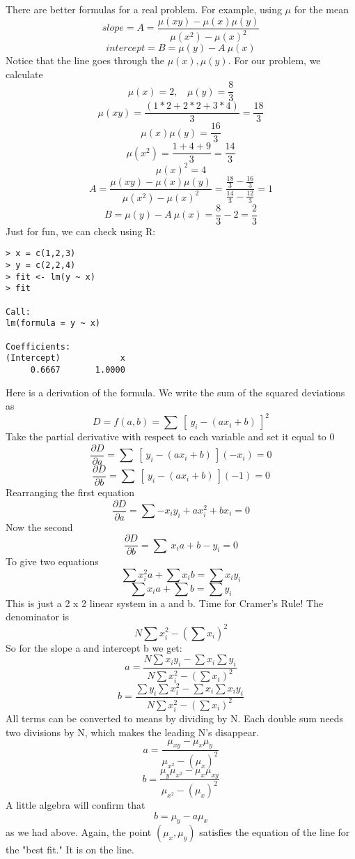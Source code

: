 \documentclass[11pt, oneside]{article}   	%
\begin{document}
There are better formulas for a real problem.  For example, using $\mu$ for the mean
\[ slope = A = \frac{\mu(xy) - \mu(x)\mu(y)}{\mu(x^2) - \mu(x)^2} \]
\[ intercept = B = \mu(y) - A \ \mu(x) \]
Notice that the line goes through the $\mu(x), \mu(y)$.  For our problem, we calculate
\[ \mu(x) = 2, \ \ \ \ \mu(y) = \frac{8}{3} \]
\[ \mu(xy) =\frac{(1*2 + 2*2 + 3*4)}{3} = \frac{18}{3}  \]
\[ \mu(x)\mu(y) = \frac{16}{3} \]
\[ \mu(x^2) = \frac{1 + 4 + 9}{3} = \frac{14}{3} \]
\[ \mu(x)^2 = 4 \]
\[ A = \frac{\mu(xy) - \mu(x)\mu(y)}{\mu(x^2) - \mu(x)^2} =\frac{ \frac{18}{3} - \frac{16}{3}}{\frac{14}{3} - \frac{12}{3} }= 1 \]
\[ B = \mu(y) - A \ \mu(x) = \frac{8}{3} - 2 = \frac{2}{3} \]
Just for fun, we can check using R:
\small
\begin{lstlisting}
> x = c(1,2,3)
> y = c(2,2,4)
> fit <- lm(y ~ x)
> fit

Call:
lm(formula = y ~ x)

Coefficients:
(Intercept)            x  
     0.6667       1.0000  
\end{lstlisting}

\large
Here is a derivation of the formula.  We write the sum of the squared deviations as
\[ D = f(a,b) = \sum \ [ \ y_i - (ax_i + b) \ ]^2 \] 
Take the partial derivative with respect to each variable and set it equal to 0
\[ \frac{\partial D}{\partial a} = \sum \ [ \ y_i - (ax_i + b) \ ](-x_i) = 0 \]
\[ \frac{\partial D}{\partial b} = \sum \ [ \ y_i - (ax_i + b) \ ](-1) = 0 \] 
Rearranging the first equation
\[ \frac{\partial D}{\partial a} = \sum -x_iy_i + ax_i^2 + bx_i  = 0 \]
Now the second
\[ \frac{\partial D}{\partial b} = \sum \ x_ia + b - y_i = 0 \]
To give two equations
\[  \sum x_i^2a + \sum x_ib = \sum  x_iy_i  \]
\[ \sum x_ia + \sum b  = \sum y_i \] 
This is just a 2 x 2 linear system in a and b.  Time for Cramer's Rule!
The denominator is 
\[  N \sum x_i^2 - (\sum x_i)^2  \] 
So for the slope a and intercept b we get:
\Large
\[ a = \frac{N \sum  x_iy_i - \sum x_i \sum y_i }{N \sum x_i^2 - (\sum x_i)^2} \]
\[ b =   \frac{\sum y_i \sum x_i^2 -  \sum x_i \sum  x_iy_i }{N \sum x_i^2 - (\sum x_i)^2}   \]
\large
All terms can be converted to means by dividing by N.  Each double sum needs two divisions by N, which makes the leading N's disappear.
\Large
\[a = \frac {\mu_{xy} - \mu_x \mu_y }{ \mu_{x^2} - (\mu_x)^2 }  \] 
\[b = \frac {\mu_{y} \mu_{x^2} - \mu_x \mu_{xy} }{ \mu_{x^2} - (\mu_x)^2 }  \] 
\large
A little algebra will confirm that 
\[ b = \mu_y - a \mu_x \]
as we had above.  Again, the point $(\mu_x,\mu_y)$ satisfies the equation of the line for the "best fit."  It is on the line.
\end{document}

